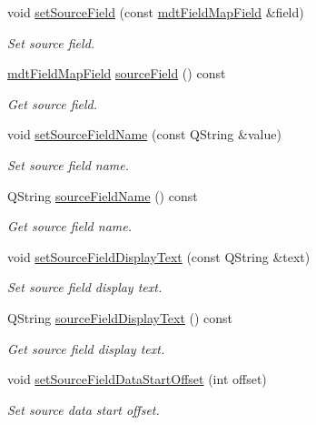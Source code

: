 \begin{DoxyCompactItemize}
void \hyperlink{classmdt_field_map_item_aebc97db4285cd4c5181082eb57fa5c1f}{set\-Source\-Field} (const \hyperlink{classmdt_field_map_field}{mdt\-Field\-Map\-Field} \&field)
\begin{DoxyCompactList}\small\item\em Set source field. \end{DoxyCompactList}\item 
\hyperlink{classmdt_field_map_field}{mdt\-Field\-Map\-Field} \hyperlink{classmdt_field_map_item_ac5d68caf99c007635c16dcc1f0ffff6c}{source\-Field} () const 
\begin{DoxyCompactList}\small\item\em Get source field. \end{DoxyCompactList}\item 
void \hyperlink{classmdt_field_map_item_a5cd708ef0209f51503b110883b564415}{set\-Source\-Field\-Name} (const Q\-String \&value)
\begin{DoxyCompactList}\small\item\em Set source field name. \end{DoxyCompactList}\item 
Q\-String \hyperlink{classmdt_field_map_item_a6b9da63e50d0b174879a74ea235cea55}{source\-Field\-Name} () const 
\begin{DoxyCompactList}\small\item\em Get source field name. \end{DoxyCompactList}\item 
void \hyperlink{classmdt_field_map_item_a8d0280fb0fac71b77958924e000eb4e5}{set\-Source\-Field\-Display\-Text} (const Q\-String \&text)
\begin{DoxyCompactList}\small\item\em Set source field display text. \end{DoxyCompactList}\item 
Q\-String \hyperlink{classmdt_field_map_item_aec5bcf5e13a51d91773c66a421c3599f}{source\-Field\-Display\-Text} () const 
\begin{DoxyCompactList}\small\item\em Get source field display text. \end{DoxyCompactList}\item 
void \hyperlink{classmdt_field_map_item_ac23aca5ff0d06f77e63206cd5519311b}{set\-Source\-Field\-Data\-Start\-Offset} (int offset)
\begin{DoxyCompactList}\small\item\em Set source data start offset. \end{DoxyCompactList}\item 

\end{DoxyCompactItemize}
